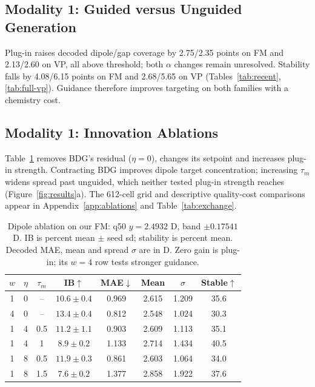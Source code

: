 \documentclass{article}
\begin{document}
\subsection{Modality 1: Guided versus Unguided Generation}\label{sec:guidworks}
Plug-in raises decoded dipole/gap coverage by 2.75/2.35 points on FM and 2.13/2.60 on VP, all above threshold; both $\alpha$ changes remain unresolved. Stability falls by 4.08/6.15 points on FM and 2.68/5.65 on VP (Tables~\ref{tab:recent}, \ref{tab:full-vp}). Guidance therefore improves targeting on both families with a chemistry cost.

\subsection{Modality 1: Innovation Ablations}\label{sec:ablations}
Table~\ref{tab:ablation} removes BDG's residual ($\eta=0$), changes its setpoint and increases plug-in strength. Contracting BDG improves dipole target concentration; increasing $\tau_m$ widens spread past unguided, which neither tested plug-in strength reaches (Figure~\ref{fig:results}a). The 612-cell grid and descriptive quality-cost comparisons appear in Appendix~\ref{app:ablations} and Table~\ref{tab:exchange}.
\begin{table}[!htbp]
\centering\small
\caption{Dipole ablation on our FM: q50 $y=2.4932$ D, band $\pm0.17541$ D. IB is percent mean $\pm$ seed sd; stability is percent mean. Decoded MAE, mean and spread $\sigma$ are in D. Zero gain is plug-in; its $w=4$ row tests stronger guidance.}
\label{tab:ablation}
\begin{tabular}{cccccccc}
\toprule
$w$ & $\eta$ & $\tau_m$ & IB$\uparrow$ & MAE$\downarrow$ & Mean & $\sigma$ & Stable$\uparrow$\\
\midrule
1 & 0 & -- & $10.6\pm0.4$ & 0.969 & 2.615 & 1.209 & 35.6\\
4 & 0 & -- & $13.4\pm0.4$ & 0.812 & 2.548 & 1.024 & 30.3\\
1 & 4 & 0.5 & $11.2\pm1.1$ & 0.903 & 2.609 & 1.113 & 35.1\\
1 & 4 & 1 & $8.9\pm0.2$ & 1.133 & 2.714 & 1.434 & 40.5\\
1 & 8 & 0.5 & $11.9\pm0.3$ & 0.861 & 2.603 & 1.064 & 34.0\\
1 & 8 & 1.5 & $7.6\pm0.2$ & 1.377 & 2.858 & 1.922 & 37.6\\
\bottomrule
\end{tabular}
\end{table}
\end{document}
